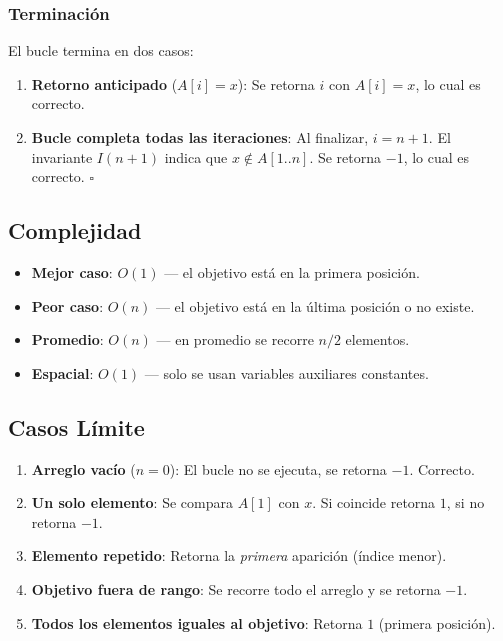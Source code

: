 \documentclass[11pt,a4paper]{article}
\newcommand{\inv}{I}
\begin{document}
\subsubsection{Terminación}
El bucle termina en dos casos:
\begin{enumerate}
    \item \textbf{Retorno anticipado} ($A[i] = x$): Se retorna $i$ con $A[i] = x$, lo cual es correcto.
    \item \textbf{Bucle completa todas las iteraciones}: Al finalizar, $i = n+1$. El invariante $\inv(n+1)$ indica que $x \notin A[1..n]$. Se retorna $-1$, lo cual es correcto. $\square$
\end{enumerate}

\subsection{Complejidad}
\begin{itemize}
    \item \textbf{Mejor caso}: $O(1)$ --- el objetivo está en la primera posición.
    \item \textbf{Peor caso}: $O(n)$ --- el objetivo está en la última posición o no existe.
    \item \textbf{Promedio}: $O(n)$ --- en promedio se recorre $n/2$ elementos.
    \item \textbf{Espacial}: $O(1)$ --- solo se usan variables auxiliares constantes.
\end{itemize}

\subsection{Casos Límite}
\begin{enumerate}
    \item \textbf{Arreglo vacío} ($n=0$): El bucle no se ejecuta, se retorna $-1$. Correcto.
    \item \textbf{Un solo elemento}: Se compara $A[1]$ con $x$. Si coincide retorna $1$, si no retorna $-1$.
    \item \textbf{Elemento repetido}: Retorna la \emph{primera} aparición (índice menor).
    \item \textbf{Objetivo fuera de rango}: Se recorre todo el arreglo y se retorna $-1$.
    \item \textbf{Todos los elementos iguales al objetivo}: Retorna $1$ (primera posición).
\end{enumerate}

\newpage
\end{document}
